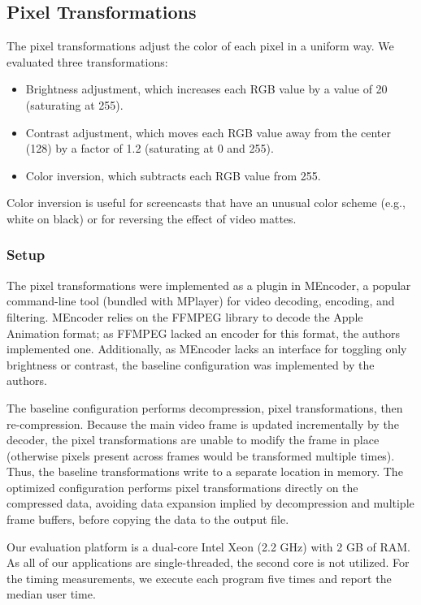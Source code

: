 \subsection{Pixel Transformations}

The pixel transformations adjust the color of each pixel in a uniform
way.  We evaluated three transformations:
\begin{itemize}
\item Brightness adjustment, which increases each RGB value by a value
of 20 (saturating at 255).
\item Contrast adjustment, which moves each RGB value away from the
center (128) by a factor of 1.2 (saturating at 0 and 255).
\item Color inversion, which subtracts each RGB value from 255.
\end{itemize}
Color inversion is useful for screencasts that have an unusual color
scheme (e.g., white on black) or for reversing the effect of video
mattes.

\subsubsection{Setup}

The pixel transformations were implemented as a plugin in MEncoder, a
popular command-line tool (bundled with MPlayer) for video decoding,
encoding, and filtering.  MEncoder relies on the FFMPEG library to
decode the Apple Animation format; as FFMPEG lacked an encoder for
this format, the authors implemented one.  Additionally, as MEncoder
lacks an interface for toggling only brightness or contrast, the
baseline configuration was implemented by the authors.

The baseline configuration performs decompression, pixel
transformations, then re-compression.  Because the main video frame is
updated incrementally by the decoder, the pixel transformations are
unable to modify the frame in place (otherwise pixels present across
frames would be transformed multiple times).  Thus, the baseline
transformations write to a separate location in memory.  The optimized
configuration performs pixel transformations directly on the
compressed data, avoiding data expansion implied by decompression and
multiple frame buffers, before copying the data to the output file.

Our evaluation platform is a dual-core Intel Xeon (2.2 GHz) with 2 GB
of RAM.  As all of our applications are single-threaded, the second
core is not utilized.  For the timing measurements, we execute each
program five times and report the median user time.


